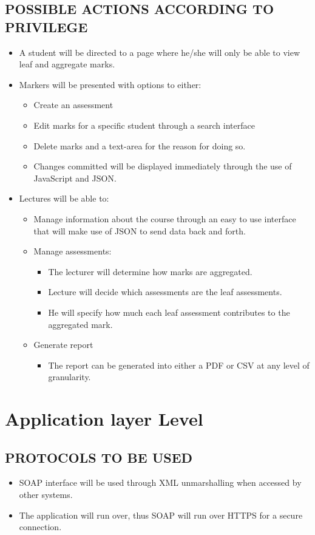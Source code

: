 \documentclass[11pt,a4paper]{article}
\begin{document}
\subsection{POSSIBLE ACTIONS ACCORDING TO PRIVILEGE}
\begin{itemize}
\item A student will be directed to a page where he/she will only be able to view leaf and aggregate marks.
\item Markers will be presented with options to either:
\begin{itemize}
\item Create an assessment 
\item Edit marks for a specific student through a search interface
\item Delete marks and a text-area for the reason for doing so.
\item Changes committed will be displayed immediately through the use of JavaScript and JSON. 
\end{itemize}
\item Lectures will be able to:
\begin{itemize}
\item Manage information about the course through an easy to use interface that will make use of JSON to send data back and forth. 
\item Manage assessments:
\begin{itemize}
\item The lecturer will determine how marks are aggregated.
\item Lecture will decide which assessments are the leaf assessments.
\item He will specify how much each leaf assessment contributes to the aggregated mark.
\end{itemize}
\item Generate report
\begin{itemize}
\item The report can be generated into either a PDF or CSV at any level of granularity.
\end{itemize}
\end{itemize}
\end{itemize}
\section{Application layer Level}
\subsection{PROTOCOLS TO BE USED}
\begin{itemize}
\item SOAP interface will be used through XML unmarshalling when accessed by other systems.
\item The application will run over, thus SOAP will run over HTTPS for a secure connection.
\end{itemize}
\end{document}
